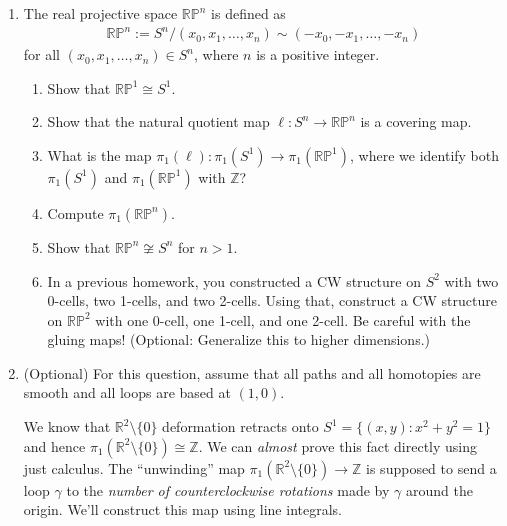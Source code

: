 \documentclass{article}
\begin{document}
\begin{enumerate}
    \item 
    The real projective space $\mathbb{RP}^n$ is defined as 
    \begin{align*}
        \mathbb{RP}^n := S^n / (x_0, x_1, \dots, x_n) \sim (-x_0, -x_1, \dots, -x_n)
    \end{align*}
    for all $(x_0, x_1, \dots, x_n) \in S^n$, where $n$ is a positive integer.
    \begin{enumerate}
        \item Show that $\mathbb{RP}^1 \cong S^1$.
        \item Show that the natural quotient map $\ell: S^n \to \mathbb{RP}^n$ is a covering map.
        \item What is the map $\pi_1(\ell):\pi_1(S^1) \to \pi_1(\mathbb{RP}^1)$, where we identify both $\pi_1(S^1)$ and $\pi_1(\mathbb{RP}^1)$ with $\mathbb{Z}$?
        \item Compute $\pi_1(\mathbb{RP}^n)$.
        \item Show that $\mathbb{RP}^n \not \cong S^n$ for $n > 1$.
        \item In a previous homework, you constructed a CW structure on $S^2$ with two 0-cells, two 1-cells, and two 2-cells. Using that, construct a CW structure on $\mathbb{RP}^2$ with one 0-cell, one 1-cell, and one 2-cell. Be careful with the gluing maps! (Optional: Generalize this to higher dimensions.)
    \end{enumerate}
    
    \newpage
    \item (Optional) For this question, assume that all paths and all homotopies are smooth and all loops are based at $(1,0)$. 
    
    We know that $\mathbb{R}^2 \setminus \{ 0 \}$ deformation retracts onto $S^1 = \{(x,y) : x^2 + y^2 = 1 \}$ and hence $\pi_1(\mathbb{R}^2 \setminus \{ 0 \}) \cong \mathbb{Z}$.
    We can \emph{almost} prove this fact directly using just calculus.  
    The ``unwinding'' map $\pi_1(\mathbb{R}^2 \setminus \{ 0 \}) \rightarrow \mathbb{Z}$ is supposed to send a loop $\gamma$ to the \emph{number of counterclockwise rotations} made by $\gamma$ around the origin. We'll construct this map using line integrals. 
    

\end{enumerate}
\end{document}
